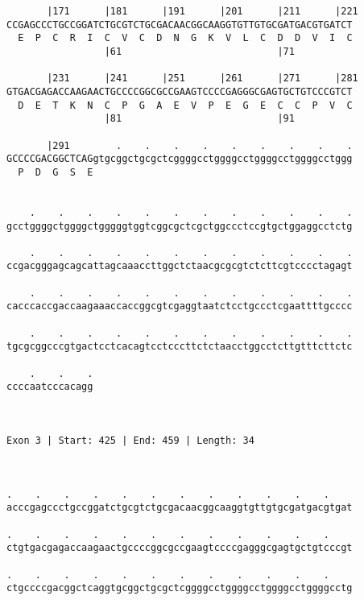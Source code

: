 \documentclass{article}
\begin{document}
\begin{Verbatim}
       |171      |181      |191      |201      |211      |221
CCGAGCCCTGCCGGATCTGCGTCTGCGACAACGGCAAGGTGTTGTGCGATGACGTGATCT
  E  P  C  R  I  C  V  C  D  N  G  K  V  L  C  D  D  V  I  C
                 |61                           |71          
  
       |231      |241      |251      |261      |271      |281
GTGACGAGACCAAGAACTGCCCCGGCGCCGAAGTCCCCGAGGGCGAGTGCTGTCCCGTCT
  D  E  T  K  N  C  P  G  A  E  V  P  E  G  E  C  C  P  V  C
                 |81                           |91          
  
       |291        .    .    .    .    .    .    .    .    .
GCCCCGACGGCTCAGgtgcggctgcgctcggggcctggggcctggggcctggggcctggg
  P  D  G  S  E                                             
                                                            
  
    .    .    .    .    .    .    .    .    .    .    .    .
gcctggggctggggctgggggtggtcggcgctcgctggccctccgtgctggaggcctctg
                                                            
    .    .    .    .    .    .    .    .    .    .    .    .
ccgacgggagcagcattagcaaaccttggctctaacgcgcgtctcttcgtcccctagagt
                                                            
    .    .    .    .    .    .    .    .    .    .    .    .
cacccaccgaccaagaaaccaccggcgtcgaggtaatctcctgccctcgaattttgcccc
                                                            
    .    .    .    .    .    .    .    .    .    .    .    .
tgcgcggcccgtgactcctcacagtcctcccttctctaacctggcctcttgtttcttctc
                                                            
    .    .    .
ccccaatcccacagg
               
               
 
Exon 3 | Start: 425 | End: 459 | Length: 34



.    .    .    .    .    .    .    .    .    .    .    .    
acccgagccctgccggatctgcgtctgcgacaacggcaaggtgttgtgcgatgacgtgat
                                                            
.    .    .    .    .    .    .    .    .    .    .    .    
ctgtgacgagaccaagaactgccccggcgccgaagtccccgagggcgagtgctgtcccgt
                                                            
.    .    .    .    .    .    .    .    .    .    .    .    
ctgccccgacggctcaggtgcggctgcgctcggggcctggggcctggggcctggggcctg
                                                            

\end{Verbatim}
\end{document}
